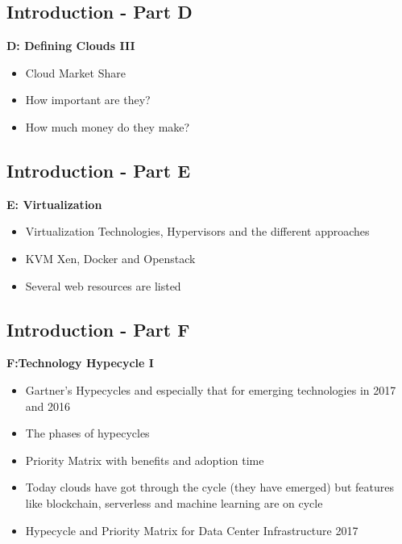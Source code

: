 \subsection{Introduction - Part D}\label{s:cloud-fundamentals-d}


\textbf{D: Defining Clouds III}
\begin{itemize}
\item Cloud Market Share
\item How important are they?
\item  How much money do they make?
\end{itemize}

\subsection{Introduction - Part E}\label{s:cloud-fundamentals-e}

\textbf{E: Virtualization}
\begin{itemize}
\item Virtualization Technologies, Hypervisors and the different approaches
\item KVM Xen, Docker and Openstack
\item Several web resources are listed
\end{itemize}

\subsection{Introduction - Part F}\label{s:cloud-fundamentals-f}

\textbf{F:Technology Hypecycle I}
\begin{itemize}
\item Gartner's Hypecycles and especially that for emerging technologies in 2017 and 2016
\item The phases of hypecycles
\item Priority Matrix with benefits and adoption time
\item Today clouds have got through the cycle (they have emerged) but features like blockchain, serverless and machine learning are on cycle
\item Hypecycle and Priority Matrix for Data Center Infrastructure 2017

\end{itemize}

